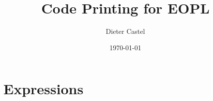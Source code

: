 \documentclass[11pt,a4paper,oneside]{article}
\title{Code Printing for EOPL}
\date{\today}
\author{Dieter Castel}
\begin{document}
\maketitle
\setcounter{section}{2}
\section{Expressions}


\end{document}
